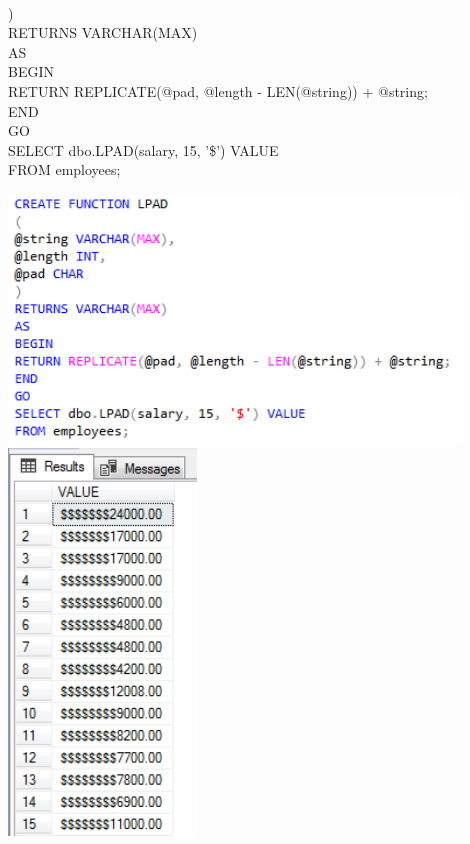 \begin{enumerate}[1.]
	\\)
	\\RETURNS VARCHAR(MAX)
	\\AS
	\\BEGIN
	    \\RETURN REPLICATE(@pad, @length - LEN(@string)) + @string;
	\\END
	\\GO
	\\SELECT dbo.LPAD(salary, 15, '\$') VALUE
	\\FROM employees;
	\begin{center}
		\includegraphics[width=12cm]{./Imagenes/actividad_05_07a}
		\includegraphics[width=5cm]{./Imagenes/actividad_05_07}
	\end{center}


\end{enumerate}
